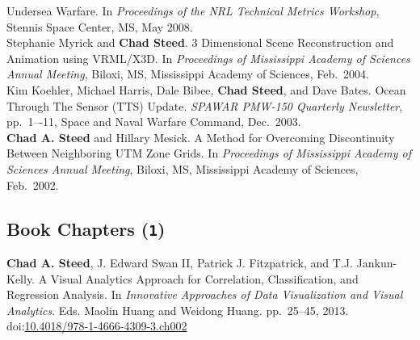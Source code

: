 \documentclass[11pt, a4paper]{article}
\newcommand{\years}[1]{\marginnote{\scriptsize #1}}
\begin{document}
\begin{sloppypar}
Undersea Warfare. In \emph{Proceedings of the NRL Technical Metrics Workshop},
Stennis Space Center, MS, May 2008. \\
\years{2004}Stephanie Myrick and \textbf{Chad Steed}. 3 Dimensional Scene
Reconstruction and Animation using VRML/X3D.  In \emph{Proceedings of
Mississippi Academy of Sciences Annual Meeting}, Biloxi, MS, Mississippi
Academy of Sciences, Feb.\ 2004.\\
\years{2003}Kim Koehler, Michael Harris, Dale Bibee, \textbf{Chad Steed},
and Dave Bates.  Ocean Through The Sensor (TTS) Update.  \emph{SPAWAR PMW-150
Quarterly Newsletter}, pp.\ 1–-11, Space and Naval Warfare Command, Dec.\ 2003.\\
\years{2002}\textbf{Chad A. Steed} and Hillary Mesick. A Method for Overcoming
Discontinuity Between Neighboring UTM Zone Grids.  In \emph{Proceedings of
Mississippi Academy of Sciences Annual Meeting}, Biloxi, MS, Mississippi
Academy of Sciences, Feb.\ 2002.
\end{sloppypar}

\subsection*{Book Chapters (\texttt{1})}
\years{2013}\textbf{Chad A. Steed}, J. Edward Swan II,
Patrick J. Fitzpatrick, and T.J. Jankun-Kelly.  A Visual Analytics Approach
for Correlation, Classification, and Regression Analysis. In \emph{Innovative Approaches
of Data Visualization and Visual Analytics}. Eds. Maolin Huang and Weidong Huang. pp.\ 25--45, 2013.
doi:\href{http://dx.doi.org/10.4018/978-1-4666-4309-3.ch002}{10.4018/978-1-4666-4309-3.ch002}
\end{document}
